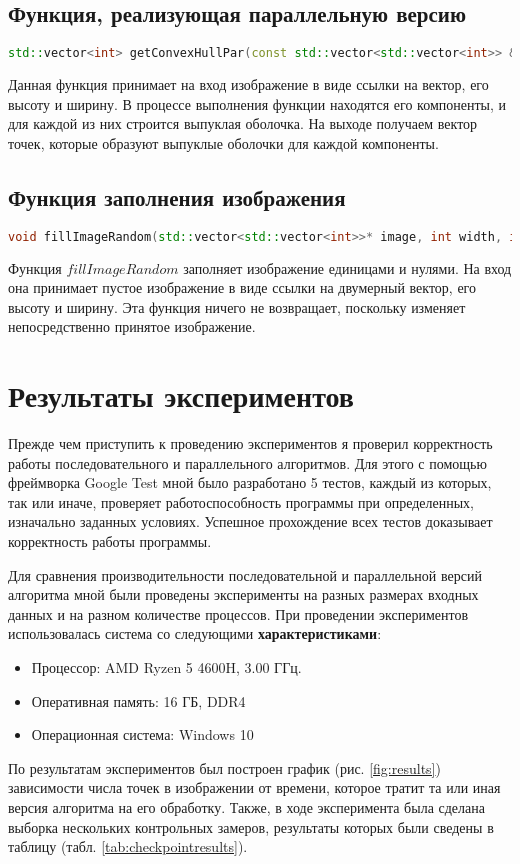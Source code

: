 \documentclass[a4paper, 12pt]{extarticle}
\newcommand{\n}{\par}
\begin{document}
	\subsection{Функция, реализующая параллельную версию}
	\begin{lstlisting}[language=C++]
		std::vector<int> getConvexHullPar(const std::vector<std::vector<int>> &image, int width, int height);
	\end{lstlisting}
	Данная функция принимает на вход изображение в виде ссылки на вектор, его высоту и ширину. В процессе выполнения функции находятся его компоненты, и для каждой из них строится выпуклая оболочка. На выходе получаем вектор точек, которые образуют выпуклые оболочки для каждой компоненты.
	
	\subsection{Функция заполнения изображения}
	\begin{lstlisting}[language=C++]
	void fillImageRandom(std::vector<std::vector<int>>* image, int width, int height);
	\end{lstlisting}
	Функция $fillImageRandom$ заполняет изображение единицами и нулями. На вход она принимает пустое изображение в виде ссылки на двумерный вектор, его высоту и ширину. Эта функция ничего не возвращает, поскольку изменяет непосредственно принятое изображение.
	\newpage
	\section{Результаты экспериментов}
	Прежде чем приступить к проведению экспериментов я проверил корректность работы последовательного и параллельного алгоритмов. Для этого с помощью фреймворка Google Test мной было разработано 5 тестов, каждый из которых, так или иначе, проверяет работоспособность программы при определенных, изначально заданных условиях. Успешное прохождение всех тестов доказывает корректность работы программы.\n
	Для сравнения производительности последовательной и параллельной версий алгоритма мной были проведены эксперименты на разных размерах входных данных и на разном количестве процессов. При проведении экспериментов использовалась система со следующими \textbf{характеристиками}:
	\begin{itemize}
		\item Процессор: AMD Ryzen 5 4600H, 3.00 ГГц.
		\item Оперативная память: 16 ГБ, DDR4
		\item Операционная система: Windows 10
	\end{itemize}
	По результатам экспериментов был построен график (рис. \ref{fig:results}) зависимости числа точек в изображении от времени, которое тратит та или иная версия алгоритма на его обработку.
	Также, в ходе эксперимента была сделана выборка нескольких контрольных замеров, результаты которых были сведены в таблицу (табл. \ref{tab:checkpointresults}).
	
\end{document}
